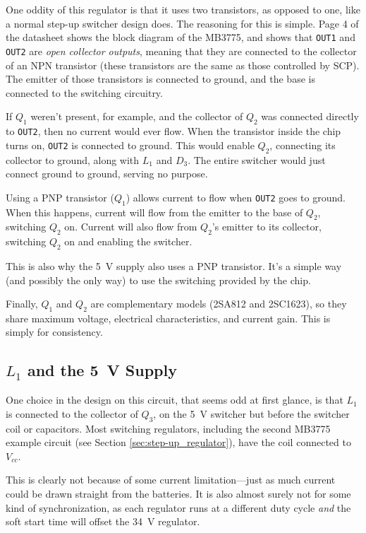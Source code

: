\documentclass{article}
\newcommand{\Vcc}{$V_{cc}$}
\newcommand{\chippin}{\texttt}
\newcommand{\model}{\textsf}
\begin{document}
One oddity of this regulator is that it uses two transistors, as
opposed to one, like a normal step-up switcher design does. The
reasoning for this is simple. Page 4 of the datasheet shows the block
diagram of the \model{MB3775}, and shows that \chippin{OUT1} and
\chippin{OUT2} are \textit{open collector outputs}, meaning that they
are connected to the collector of an NPN transistor (these transistors
are the same as those controlled by SCP). The emitter of those
transistors is connected to ground, and the base is connected to the
switching circuitry.

If $Q_1$ weren't present, for example, and the collector of $Q_2$ was
connected directly to \chippin{OUT2}, then no current would ever
flow. When the transistor inside the chip turns on, \chippin{OUT2} is
connected to ground. This would enable $Q_2$, connecting its collector
to ground, along with $L_1$ and $D_3$. The entire switcher would just
connect ground to ground, serving no purpose.

Using a PNP transistor ($Q_1$) allows current to flow when
\chippin{OUT2} goes to ground. When this happens, current will flow
from the emitter to the base of $Q_2$, switching $Q_2$ on. Current
will also flow from $Q_2$'s emitter to its collector, switching $Q_2$
on and enabling the switcher.

This is also why the \qty{5}{\volt} supply also uses a PNP
transistor. It's a simple way (and possibly the only way) to use the
switching provided by the chip.

Finally, $Q_1$ and $Q_2$ are complementary models (\model{2SA812} and
\model{2SC1623}), so they share maximum voltage, electrical
characteristics, and current gain. This is simply for consistency.

\subsection{$L_1$ and the \qty{5}{\volt} Supply}
\label{sec:l1_and_5v}
One choice in the design on this circuit, that seems odd at first
glance, is that $L_1$ is connected to the collector of $Q_3$, on the
\qty{5}{\volt} switcher but before the switcher coil or
capacitors. Most switching regulators, including the second
\model{MB3775} example circuit (see Section
\ref{sec:step-up_regulator}), have the coil connected to \Vcc{}.

This is clearly not because of some current limitation---just as much
current could be drawn straight from the batteries. It is also almost
surely not for some kind of synchronization, as each regulator runs at
a different duty cycle \textit{and} the soft start time will offset
the \qty{34}{\volt} regulator.
\end{document}
